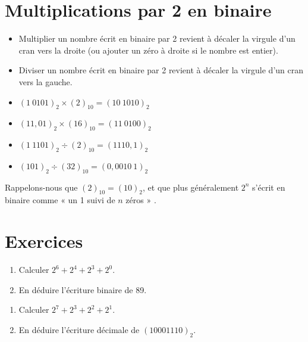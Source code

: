 \section{Multiplications par 2 en binaire}

\begin{propriete}[]
    \begin{itemize}
        \item 	Multiplier un nombre écrit en binaire par 2 revient à décaler la virgule d'un cran vers la droite (ou ajouter un zéro à droite si le nombre est entier).
        \item 	Diviser un nombre écrit en binaire par 2 revient à décaler la virgule d'un cran vers la gauche.
    \end{itemize}
\end{propriete}

\begin{exemple}[s]
    \begin{itemize}
        \item 	$(1\ 0101)_2\times (2)_{10}=(10\ 1010)_2$
        \item 	$(11,01)_2\times (16)_{10}=(11\ 0100)_2$
        \item 	$(1\ 1101)_2\div (2)_{10}=(1110,1)_2$
        \item 	$(101)_2\div (32)_{10}=(0,0010\ 1)_2$
    \end{itemize}
\end{exemple}

\begin{remarque}
    Rappelons-nous que $(2)_{10}=(10)_2$, et que plus généralement $2^n$ s'écrit en binaire comme «  un 1 suivi de $n$ zéros » .
\end{remarque}



\section{Exercices}

\begin{exercice}
    \begin{enumerate}
        \item 	Calculer $2^6+2^4+2^3+2^0$.
        \item 	En déduire l'écriture binaire de 89.
    \end{enumerate}
\end{exercice}

\begin{exercice}
    \begin{enumerate}
        \item 	Calculer $2^7+2^3+2^2+2^1$.
        \item 	En déduire l'écriture décimale de  $(1000 1110)_2$.
    \end{enumerate}
\end{exercice}

